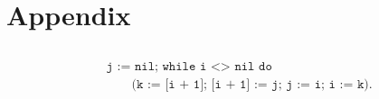 
\section{Appendix}

\hypertarget{reversal}{\subsection{}}
\begin{align*}
&\texttt{j := nil; while i } \texttt{<>} \texttt{ nil do} \\
&\quad \quad \texttt{(k := [i + 1]; [i + 1] := j; j := i; i := k).}
\end{align*}
\subsection{}

